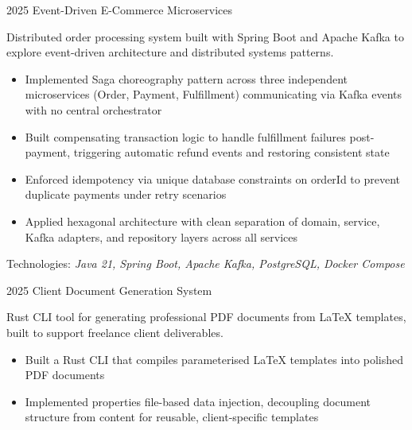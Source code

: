\documentclass[9pt]{developercv} %
\begin{document}
\vspace{-10 pt}
\begin{entrylist}
    \entry
    {2025}
    {Event-Driven E-Commerce Microservices}
    {}
    {\vspace{-10pt}
    \begin{flushleft}
        Distributed order processing system built with Spring Boot and Apache Kafka to explore event-driven architecture and distributed systems patterns.
    \end{flushleft}
    \begin{itemize}[noitemsep,topsep=0pt,parsep=0pt,partopsep=0pt, leftmargin=15pt]
        \item Implemented Saga choreography pattern across three independent microservices (Order, Payment, Fulfillment) communicating via Kafka events with no central orchestrator
        \item Built compensating transaction logic to handle fulfillment failures post-payment, triggering automatic refund events and restoring consistent state
        \item Enforced idempotency via unique database constraints on orderId to prevent duplicate payments under retry scenarios
        \item Applied hexagonal architecture with clean separation of domain, service, Kafka adapters, and repository layers across all services
    \end{itemize}
    Technologies: \textit{Java 21, Spring Boot, Apache Kafka, PostgreSQL, Docker Compose}
    }
    \entry
    {2025}
    {Client Document Generation System}
    {}
    {\vspace{-10pt}
    \begin{flushleft}
        Rust CLI tool for generating professional PDF documents from LaTeX templates, built to support freelance client deliverables.
    \end{flushleft}
    \begin{itemize}[noitemsep,topsep=0pt,parsep=0pt,partopsep=0pt, leftmargin=15pt]
        \item Built a Rust CLI that compiles parameterised LaTeX templates into polished PDF documents
        \item Implemented properties file-based data injection, decoupling document structure from content for reusable, client-specific templates

\end{itemize}}
\end{entrylist}
\end{document}
